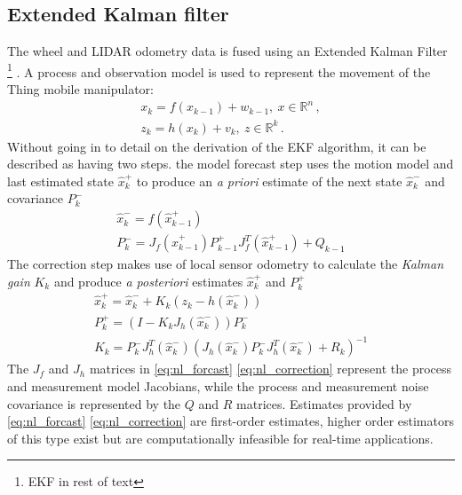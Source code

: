 \documentclass[times, utf8, diplomski, english]{fer}
\begin{document}
\subsection{Extended Kalman filter}
The wheel and LIDAR odometry data is fused using an Extended Kalman Filter \footnote{EKF in rest of text} \citep{fujii2013extended}.
A process and observation model is used to represent the movement of the Thing mobile manipulator:
\begin{subequations}\label{state_space_nl2}
\begin{gather}
x_k = f\left(x_{k-1}\right) + w_{k-1} , \ x \in \mathbb{R}^n\, , \\
z_k = h\left(x_k\right) + v_k, \ z \in \mathbb{R}^k\, .
\end{gather}
\end{subequations}
Without going in to detail on the derivation of the EKF algorithm, it can be described as having two steps.\:
the model forecast step uses the motion model and last estimated state $\hat{x}_k^+$ to produce an \textit{a priori} estimate of the next state $\hat{x}_k^-$ and covariance $P_k^-$
\begin{subequations}\label{eq:nl_forcast}
\begin{gather}
\hat{x}_k^- = f\left(\hat{x}_{k-1}^+\right) \\
P_k^- = J_f\left(\hat{x}_{k-1}^+\right)P_{k-1}^+J_f^T\left(\hat{x}_{k-1}^+\right) + Q_{k-1}
\end{gather}
\end{subequations}
The correction step makes use of local sensor odometry to calculate the \textit{Kalman gain} $K_k$ and produce \textit{a posteriori} estimates $\hat{x}_k^+$ and $P_k^+$ 
\begin{subequations}\label{eq:nl_correction}
\begin{gather}
\hat{x}_k^+ = \hat{x}_k^- + K_k\left(z_k - h\left(\hat{x}_k^-\right)\right) \\
P_k^+ = \left(I - K_kJ_h\left(\hat{x}_k^-\right)\right)P_k^- \\
K_k = P_k^-J_h^T\left(\hat{x}_k^-\right)\left(J_h\left(\hat{x}_k^-\right)P_k^-J_h^T\left(\hat{x}_k^-\right) + R_k\right)^{-1} 
\end{gather}
\end{subequations}
The $J_f$ and $J_h$ matrices in \eqref{eq:nl_forcast} \eqref{eq:nl_correction} represent the process and measurement model Jacobians, while the process and measurement noise covariance is represented by the $Q$ and $R$ matrices.
Estimates provided by \eqref{eq:nl_forcast} \eqref{eq:nl_correction} are first-order estimates, higher order estimators of this type exist but are computationally infeasible for real-time applications.
\end{document}
